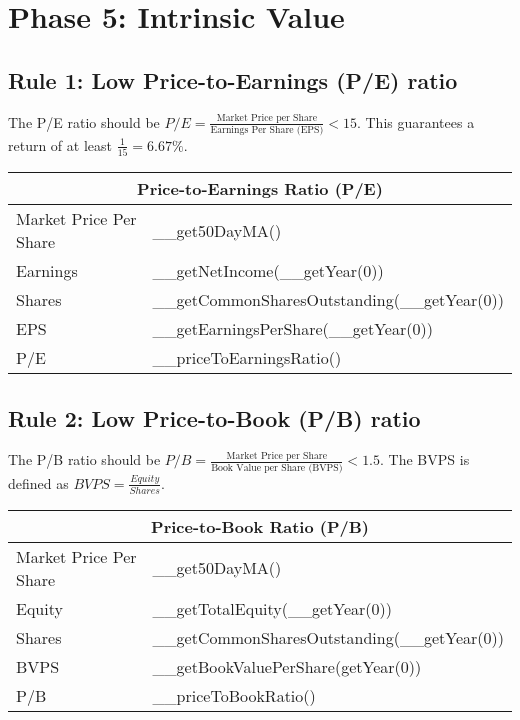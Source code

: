 \section{Phase 5: Intrinsic Value}

\subsection{Rule 1: Low Price-to-Earnings (P/E) ratio}

The P/E ratio should be $P/E = \frac{\text{Market Price per Share}}{\text{Earnings Per Share (EPS)}} < 15$.
This guarantees a return of at least $\frac{1}{15} = 6.67\%$.\\

\begin{tabularx}{\textwidth}{|X|X|}
 \hline
 \multicolumn{2}{|c|}{Price-to-Earnings Ratio (P/E)}                   \\
 \hline
 Market Price Per Share   & __get50DayMA()                             \\
 Earnings                 & __getNetIncome(__getYear(0))               \\
 Shares                   & __getCommonSharesOutstanding(__getYear(0)) \\
 EPS                      & __getEarningsPerShare(__getYear(0))        \\
 \rowcolor{lightgray} P/E & __priceToEarningsRatio()                   \\
 \hline
\end{tabularx}

\subsection{Rule 2: Low Price-to-Book (P/B) ratio}

The P/B ratio should be $P/B = \frac{\text{Market Price per Share}}{\text{Book Value per Share (BVPS)}} < 1.5$.
The BVPS is defined as $BVPS = \frac{Equity}{Shares}$.\\

\begin{tabularx}{\textwidth}{|X|X|}
 \hline
 \multicolumn{2}{|c|}{Price-to-Book Ratio (P/B)}                       \\
 \hline
 Market Price Per Share   & __get50DayMA()                             \\
 Equity                   & __getTotalEquity(__getYear(0))             \\
 Shares                   & __getCommonSharesOutstanding(__getYear(0)) \\
 BVPS                     & __getBookValuePerShare(getYear(0))         \\
 \rowcolor{lightgray} P/B & __priceToBookRatio()                       \\
 \hline
\end{tabularx}

